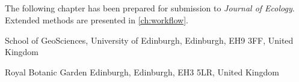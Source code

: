 \begin{refsection}




\chapter[\chaptertitle]{\chaptertitle}
\label{ch:tls}

The following chapter has been prepared for submission to \textit{Journal of Ecology}. Extended methods are presented in \autoref{ch:workflow}.


\begin{paperaffil}
\item{School of GeoSciences, University of Edinburgh, Edinburgh, EH9 3FF, United Kingdom}
\item{Royal Botanic Garden Edinburgh, Edinburgh, EH3 5LR, United Kingdom}
\end{paperaffil}



\end{refsection}
